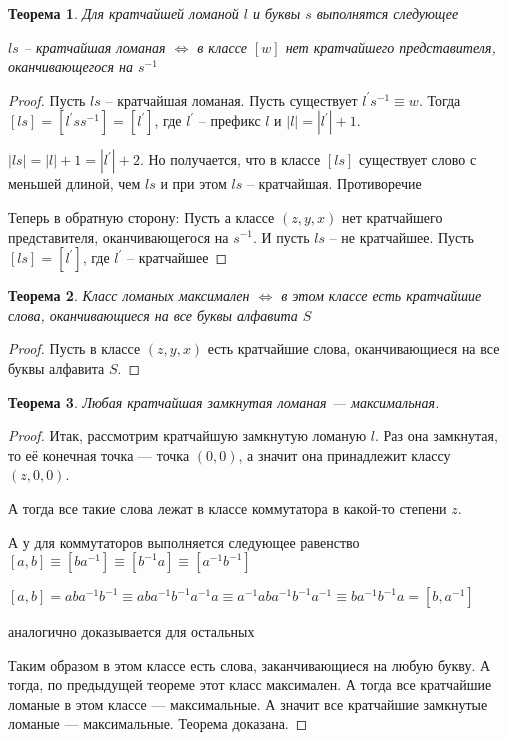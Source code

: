 \documentclass[12pt,a4paper, flushleft]{article}
\newtheorem{Th}{Теорема}[section]
\newcommand{\p}[1]{#1^{\prime}}
\begin{document}
\begin{Th}
	Для кратчайшей ломаной $l$ и буквы $s$ выполнятся следующее 
	
	$ls$ -- кратчайшая ломаная $\Longleftrightarrow$ в классе $[w]$ нет кратчайшего представителя, оканчивающегося на $s^{-1}$ 
\end{Th}
\begin{proof}
	Пусть $ls$ -- кратчайшая ломаная. Пусть существует $\p l s^{-1}\equiv w$. Тогда $[ls] = [\p l s s^{-1}] = [\p l]$, где $\p l$  -- префикс $l$ и $|l| = |\p l| + 1$.
	
	$|ls| = |l| + 1 = |\p l| + 2$. Но получается, что в классе $[ls]$ существует слово с меньшей длиной, чем $ls$ и при этом $ls$ -- кратчайшая. Противоречие
	
	Теперь в обратную сторону: Пусть а классе $(z, y, x)$ нет кратчайшего представителя, оканчивающегося на $s^{-1}$. И пусть $ls$ -- не кратчайшее. Пусть $[ls] = [\p l]$, где $\p l$ -- кратчайшее
\end{proof}

\begin{Th}
	Класс ломаных максимален $\Longleftrightarrow$ в этом классе есть кратчайшие слова, оканчивающиеся на все буквы алфавита $S$
\end{Th}
\begin{proof}
	Пусть в классе $(z, y, x)$ есть кратчайшие слова, оканчивающиеся на все буквы алфавита $S$. 
\end{proof}

\begin{Th}
	Любая кратчайшая замкнутая ломаная --- максимальная.
\end{Th}
\begin{proof}
	Итак, рассмотрим кратчайшую замкнутую ломаную $l$. Раз она замкнутая, то её конечная точка --- точка $(0, 0)$, а значит она принадлежит классу $(z, 0, 0)$. 	
	
	А тогда все такие слова лежат в классе коммутатора в какой-то степени $z$.
	
	А у для коммутаторов выполняется следующее равенство $[a, b] \equiv [ba^{-1}] \equiv [b^{-1}a]\equiv [a^{-1}b^{-1}]$
	
	$[a, b] = aba^{-1}b^{-1}\equiv aba^{-1}b^{-1}a^{-1}a\equiv a^{-1}aba^{-1}b^{-1}a^{-1}\equiv ba^{-1}b^{-1}a = [b, a^{-1}]$
	
	аналогично доказывается для остальных
	
	Таким образом в этом классе есть слова, заканчивающиеся на любую букву. А тогда, по предыдущей теореме этот класс максимален. А тогда все кратчайшие ломаные в этом классе --- максимальные. А значит все кратчайшие замкнутые ломаные --- максимальные. Теорема доказана.	
\end{proof}
\end{document}
